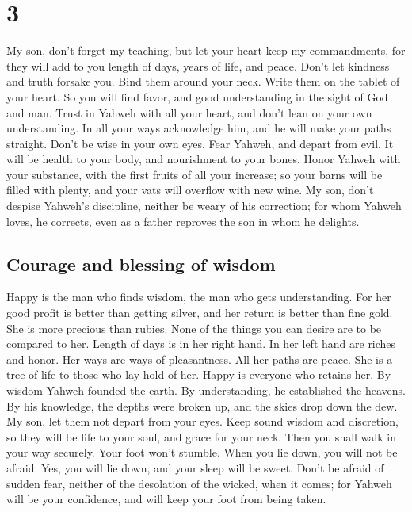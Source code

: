 \hypertarget{section-2}{%
\section{3}\label{section-2}}

 My son, don't forget my teaching, but let your heart keep
my commandments,  for they will add to you length of days,
years of life, and peace.  Don't let kindness and truth
forsake you. Bind them around your neck. Write them on the tablet of
your heart.  So you will find favor, and good
understanding in the sight of God and man.  Trust in
Yahweh with all your heart, and don't lean on your own understanding.
 In all your ways acknowledge him, and he will make your
paths straight.  Don't be wise in your own eyes. Fear
Yahweh, and depart from evil.  It will be health to your
body, and nourishment to your bones.  Honor Yahweh with
your substance, with the first fruits of all your increase;
 so your barns will be filled with plenty, and your vats
will overflow with new wine.  My son, don't despise
Yahweh's discipline, neither be weary of his correction; 
for whom Yahweh loves, he corrects, even as a father reproves the son in
whom he delights.

\hypertarget{courage-and-blessing-of-wisdom}{%
\subsection{Courage and blessing of
wisdom}\label{courage-and-blessing-of-wisdom}}

 Happy is the man who finds wisdom, the man who gets
understanding.  For her good profit is better than
getting silver, and her return is better than fine gold. 
She is more precious than rubies. None of the things you can desire are
to be compared to her.  Length of days is in her right
hand. In her left hand are riches and honor.  Her ways
are ways of pleasantness. All her paths are peace.  She
is a tree of life to those who lay hold of her. Happy is everyone who
retains her.  By wisdom Yahweh founded the earth. By
understanding, he established the heavens.  By his
knowledge, the depths were broken up, and the skies drop down the dew.
 My son, let them not depart from your eyes. Keep sound
wisdom and discretion,  so they will be life to your
soul, and grace for your neck.  Then you shall walk in
your way securely. Your foot won't stumble.  When you lie
down, you will not be afraid. Yes, you will lie down, and your sleep
will be sweet.  Don't be afraid of sudden fear, neither
of the desolation of the wicked, when it comes;  for
Yahweh will be your confidence, and will keep your foot from being
taken.

